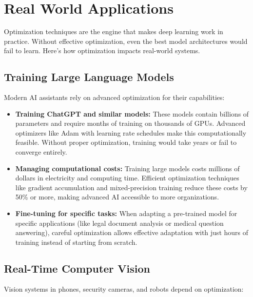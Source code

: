 
\section{Real World Applications}
\label{sec:optimization-real-world}

Optimization techniques are the engine that makes deep learning work in practice. Without effective optimization, even the best model architectures would fail to learn. Here's how optimization impacts real-world systems.

\subsection{Training Large Language Models}

Modern AI assistants rely on advanced optimization for their capabilities:

\begin{itemize}
    \item \textbf{Training ChatGPT and similar models:} These models contain billions of parameters and require months of training on thousands of GPUs. Advanced optimizers like Adam with learning rate schedules make this computationally feasible. Without proper optimization, training would take years or fail to converge entirely.
    
    \item \textbf{Managing computational costs:} Training large models costs millions of dollars in electricity and computing time. Efficient optimization techniques like gradient accumulation and mixed-precision training reduce these costs by 50\% or more, making advanced AI accessible to more organizations.
    
    \item \textbf{Fine-tuning for specific tasks:} When adapting a pre-trained model for specific applications (like legal document analysis or medical question answering), careful optimization allows effective adaptation with just hours of training instead of starting from scratch.
\end{itemize}

\subsection{Real-Time Computer Vision}

Vision systems in phones, security cameras, and robots depend on optimization:

